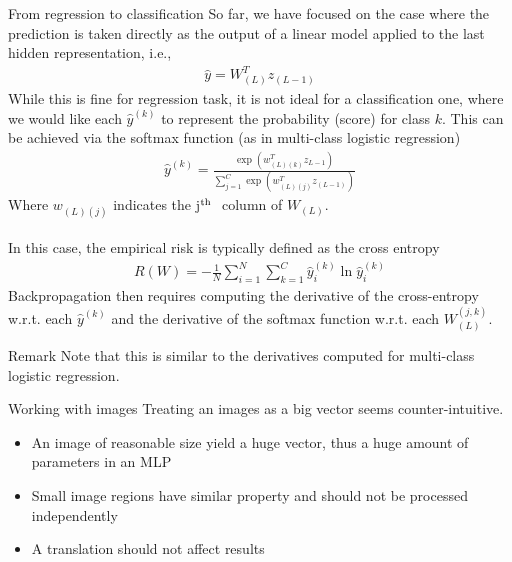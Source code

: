 \begin{parag}{From regression to classification}
    So far, we have focused on the case where the prediction is taken directly as the output of a linear model applied to the last hidden representation, i.e.,
	\begin{align*} 
		\hat{y} = W_{\left(L\right)}^{T}z_{\left(L-1\right)}
	\end{align*}
	While this is fine for regression task, it is not ideal for a classification one, where we would like each $\hat{y}^{\left(k\right)}$ to represent the probability (score) for class $k$. This can be achieved via the softmax function (as in multi-class logistic regression)
	\begin{align*} 
		\hat{y}^{\left(k\right)} = \frac{\exp\left(w_{\left(L\right)\left(k\right)}^{T}z_{L-1}\right)}{\sum_{j= 1}^{C}\exp\left(w_{\left(L\right)\left(j\right)}^{T}z_{\left(L-1\right)}\right)}
	\end{align*}
	Where $w_{\left(L\right)\left(j\right)}$ indicates the j$\textsuperscript{th}\ $ column of $W_{\left(L\right)}$.\\
	$ $\\
	In this case, the empirical risk is typically defined as the cross entropy
	\begin{align*} 
		R\left(W\right) = -\frac{1}{N}\sum_{i= 1}^{N}\sum_{k= 1}^{C}\hat{y}_i^{\left(k\right)}\ln \hat{y}_i^{\left(k\right)}
	\end{align*}
	Backpropagation then requires computing the derivative of the cross-entropy w.r.t. each $\hat{y}^{\left(k\right)}$ and the derivative of the softmax function w.r.t. each $W_{\left(L\right)}^{\left(j, k\right)}$.
	\begin{subparag}{Remark}
	    Note that this is similar to the derivatives computed for multi-class logistic regression.
	\end{subparag}
\end{parag}



\begin{parag}{Working with images}
    Treating an images as a big vector seems counter-intuitive. 
	\begin{itemize}
		\item An image of reasonable size yield a huge vector, thus a huge amount of parameters in an MLP
		\item Small image regions have similar property and should not be processed independently
		\item A translation should not affect results
	\end{itemize}
	
\end{parag}













